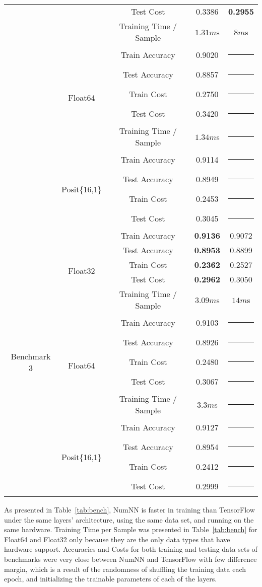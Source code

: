 \begin{table}[!htb]
\begin{tabular}{|c | c | c || c | c |}
		& & Test Cost & 0.3386 & \textbf{0.2955}\\
		& & Training Time / Sample & \textbf{$\mathbf{1.31}m$}s & $8m$s \\\cline{2-5}
		& \multirow{5}{*}{Float64} & Train Accuracy & 0.9020 & \rule{5em}{1pt} \\
		& & Test Accuracy & 0.8857 & \rule{5em}{1pt} \\
		& & Train Cost & 0.2750 & \rule{5em}{1pt} \\
		& & Test Cost & 0.3420 & \rule{5em}{1pt} \\
		& & Training Time / Sample & $1.34m$s & \rule{5em}{1pt} \\\cline{2-5}
		& \multirow{4}{*}{Posit\{16,1\}} & Train Accuracy & 0.9114 & \rule{5em}{1pt} \\
		& & Test Accuracy & 0.8949 & \rule{5em}{1pt} \\
		& & Train Cost & 0.2453 & \rule{5em}{1pt} \\
		& & Test Cost & 0.3045 & \rule{5em}{1pt} \\\hline
		\multirow{14}{*}{Benchmark 3\footref{batchnorm}} & \multirow{5}{*}{Float32} & Train Accuracy & \textbf{0.9136} & 0.9072\\
		& & Test Accuracy & \textbf{0.8953} & 0.8899\\
		& & Train Cost & \textbf{0.2362} & 0.2527\\
		& & Test Cost & \textbf{0.2962} & 0.3050\\
		& & Training Time / Sample & \textbf{$\mathbf{3.09}m$}s & $14m$s\\\cline{2-5}
		& \multirow{5}{*}{Float64} & Train Accuracy & 0.9103 & \rule{5em}{1pt} \\
		& & Test Accuracy & 0.8926 & \rule{5em}{1pt} \\
		& & Train Cost & 0.2480 & \rule{5em}{1pt} \\
		& & Test Cost & 0.3067 & \rule{5em}{1pt} \\
		& & Training Time / Sample & $3.3m$s & \rule{5em}{1pt} \\\cline{2-5}
		& \multirow{4}{*}{Posit\{16,1\}} & Train Accuracy & 0.9127 & \rule{5em}{1pt} \\
		& & Test Accuracy & 0.8954 & \rule{5em}{1pt} \\
		& & Train Cost & 0.2412 & \rule{5em}{1pt} \\
		& & Test Cost & 0.2999 & \rule{5em}{1pt} \\\hline		
	\end{tabular}
\end{table}

As presented in Table~\ref{tab:bench}, NumNN is faster in training than TensorFlow under the same layers' architecture, using the same data set, and running on the same hardware. Training Time per Sample was presented in Table~\ref{tab:bench} for Float64 and Float32 only because they are the only data types that have hardware support. Accuracies and Costs for both training and testing data sets of benchmarks were very close between NumNN and TensorFlow with few difference margin, which is a result of the randomness of shuffling the training data each epoch, and initializing the trainable parameters of each of the layers.

